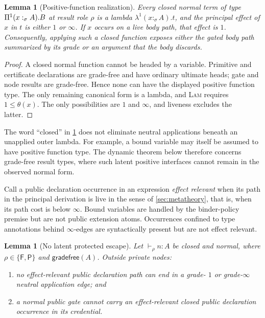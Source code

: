 \documentclass[11pt]{article}
\numberwithin{equation}{section}
\theoremstyle{definition}
\theoremstyle{plain}
\newtheorem{lemma}[definition]{Lemma}
\theoremstyle{remark}
\newcommand{\Frm}{\mathsf F}
\newcommand{\Prs}{\mathsf P}
\newcommand{\absent}{\boldsymbol\infty}
\begin{document}
\begin{lemma}[Positive-function realization]\label{lem:positive-function}
Every closed normal term of type
\(
  \Pi^1(x:_{\sigma}A).B
\)
at result role \(\rho\) is a lambda \(\lambda^1(x:_{\sigma}A).t\), and the principal effect of \(x\) in
\(t\) is either \(1\) or \(\absent\).  If \(x\) occurs on a live body path,
that effect is \(1\).  Consequently, applying such a closed function exposes
either the gated body path summarized by its grade or an argument that the
body discards.
\end{lemma}

\begin{proof}
A closed normal function cannot be headed by a variable.  Primitive and
certificate declarations are grade-free and have ordinary ultimate heads;
gate and node results are grade-free.  Hence none can have the displayed
positive function type.  The only remaining canonical form is a lambda, and
\textsc{Lam} requires \(1\le\theta(x)\).  The only possibilities are \(1\)
and \(\absent\), and liveness excludes the latter.
\end{proof}

The word ``closed'' in \cref{lem:positive-function} does not eliminate neutral
applications beneath an unapplied outer lambda.  For example, a bound variable
may itself be assumed to have positive function type.  The dynamic theorem
below therefore concerns grade-free result types, where such latent positive
interfaces cannot remain in the observed normal form.

Call a public declaration occurrence in an expression \emph{effect relevant}
when its path in the principal derivation is live in the sense of
\cref{sec:metatheory}, that is, when its path cost is below \(\absent\).
Bound variables are handled by the binder-policy premise but are not public
extension atoms.  Occurrences confined to type annotations behind
\(\absent\)-edges are syntactically present but are not effect relevant.

\begin{lemma}[No latent protected escape]\label{lem:no-latent-escape}
Let \(\vdash_{\rho}n:A\) be closed and normal, where
\(\rho\in\{\Frm,\Prs\}\) and \(\mathsf{gradefree}(A)\).  Outside private
nodes:
\begin{enumerate}[label=(\roman*),leftmargin=2.5em]
\item no effect-relevant public declaration path can end in a grade-
\(1\) or grade-\(\absent\) neutral application edge; and
\item a normal public gate cannot carry an effect-relevant closed public
declaration occurrence in its credential.
\end{enumerate}
\end{lemma}
\end{document}
